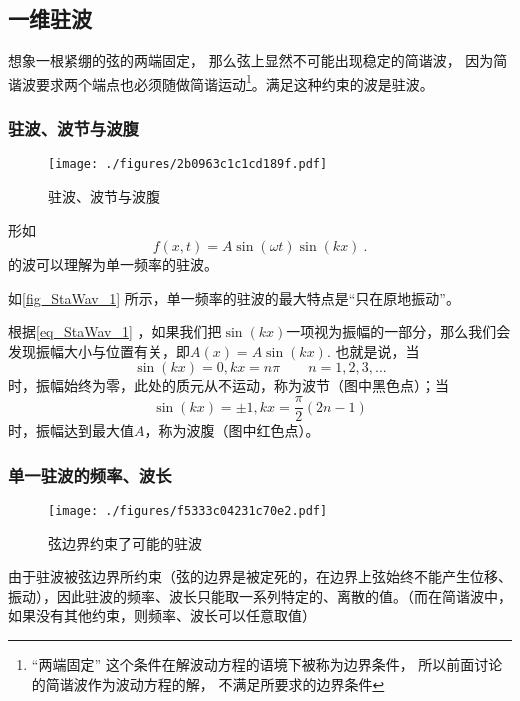 
\begin{issues}
\issueDraft
\end{issues}


\subsection{一维驻波}
想象一根紧绷的弦的两端固定， 那么弦上显然不可能出现稳定的简谐波， 因为简谐波要求两个端点也必须随做简谐运动\footnote{“两端固定” 这个条件在解波动方程的语境下被称为边界条件， 所以前面讨论的简谐波作为波动方程的解， 不满足所要求的边界条件}。满足这种约束的波是驻波。

\subsubsection{驻波、波节与波腹}
\begin{figure}[ht]
\centering
\texttt{[image: ./figures/2b0963c1c1cd189f.pdf]}
\caption{驻波、波节与波腹} \label{fig_StaWav_1}
\end{figure}

形如
\begin{equation}\label{eq_StaWav_1}
f(x,t)=A\sin(\omega t)\sin(kx)~.
\end{equation}
的波可以理解为单一频率的驻波。

如\autoref{fig_StaWav_1} 所示，单一频率的驻波的最大特点是“只在原地振动”。

根据\autoref{eq_StaWav_1} ，如果我们把$\sin(kx)$一项视为振幅的一部分，那么我们会发现振幅大小与位置有关，即$A(x) = A \sin(kx)$. 也就是说，当$$\sin(kx)=0, kx=n\pi \qquad n=1,2,3,...$$时，振幅始终为零，此处的质元从不运动，称为波节（图中黑色点）；当$$\sin(kx)=\pm1, kx=\frac{\pi}{2} (2n-1)$$时，振幅达到最大值$A$，称为波腹（图中红色点）。

\subsubsection{单一驻波的频率、波长}
\begin{figure}[ht]
\centering
\texttt{[image: ./figures/f5333c04231c70e2.pdf]}
\caption{弦边界约束了可能的驻波} \label{fig_StaWav_2}
\end{figure}

由于驻波被弦边界所约束（弦的边界是被定死的，在边界上弦始终不能产生位移、振动），因此驻波的频率、波长只能取一系列特定的、离散的值。（而在简谐波中，如果没有其他约束，则频率、波长可以任意取值）

